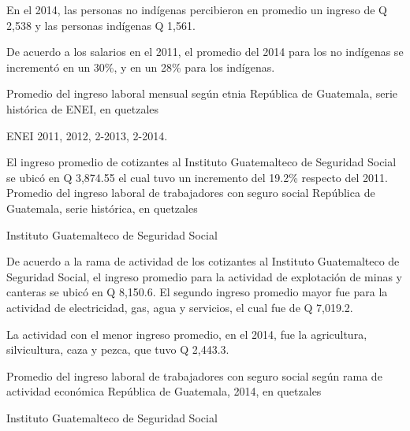 %
{%
En el 2014, las personas no indígenas percibieron en promedio un ingreso de Q 2,538 y las personas indígenas Q 1,561.

De acuerdo a los salarios en el 2011, el promedio del 2014 para los no indígenas se incrementó en un 30\%, y en un 28\% para los indígenas.}%
{%
	Promedio del ingreso laboral mensual según etnia} %
{%
	República de Guatemala, serie histórica de ENEI, en quetzales } %
{%
	\begin{tikzpicture}[x=1pt,y=1pt]    \end{tikzpicture}}%
{%
	ENEI 2011, 2012, 2-2013, 2-2014.} %



%
{%
El ingreso promedio de cotizantes al Instituto Guatemalteco de Seguridad Social se ubicó en Q 3,874.55 el cual tuvo un incremento del 19.2\% respecto del 2011.}%
{%
	Promedio del ingreso laboral de trabajadores con seguro social } %
{%
	República de Guatemala, serie histórica, en quetzales } %
{%
	\begin{tikzpicture}[x=1pt,y=1pt]    \end{tikzpicture}}%
{%
	Instituto Guatemalteco de Seguridad Social} %



%
{%
De acuerdo a la rama de actividad de los cotizantes al Instituto Guatemalteco de Seguridad Social, el ingreso promedio para la actividad de explotación de minas y canteras se ubicó en Q 8,150.6. El segundo ingreso promedio mayor fue para la actividad de electricidad, gas, agua y servicios, el cual fue de Q 7,019.2.

La actividad con el menor ingreso promedio, en el 2014, fue la agricultura, silvicultura, caza y pezca, que tuvo Q 2,443.3.}%
{%
	Promedio del ingreso laboral de trabajadores con seguro social según rama de actividad económica} %
{%
	República de Guatemala, 2014, en quetzales } %
{%
	\begin{tikzpicture}[x=1pt,y=1pt]    \end{tikzpicture}}%
{%
	Instituto Guatemalteco de Seguridad Social} %

  

